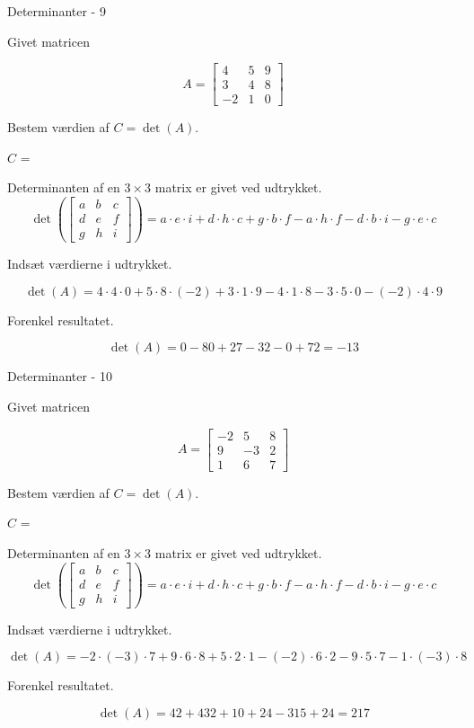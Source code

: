 \documentclass{article}
\begin{document}
\begin{exercise}{Determinanter - 9}
	
	Givet matricen
	
	\[
	A = \left[\begin{array}{rrr}
	4 & 5 & 9 \\ 
	3 & 4 & 8 \\
	-2 & 1 & 0
	\end{array} \right]
	\]
	
	Bestem værdien af $C = \det(A)$.
	
	$C$ = 
	
	\hint
	Determinanten af en $3 \times 3$ matrix er givet ved udtrykket.
	\[
	\det \left( \left[\begin{array}{rrr}
	a & b & c \\ 
	d & e & f \\
	g & h & i
	\end{array} \right] \right) = a \cdot e \cdot i + d \cdot h \cdot c + g \cdot b \cdot f - a \cdot h \cdot f - d \cdot b \cdot i - g \cdot e \cdot c
	\]
	
	\hint
	Indsæt værdierne i udtrykket.
	
	\hint
	\[
	\det \left( A \right) = 4 \cdot 4 \cdot 0 + 5 \cdot 8 \cdot (-2) + 3 \cdot 1 \cdot 9 - 4 \cdot 1 \cdot 8 - 3 \cdot 5 \cdot 0 - (-2) \cdot 4 \cdot 9
	\]
	
	\hint
	Forenkel resultatet.
	
	\hint
	\[
	\det \left( A \right) =  0 - 80 + 27 - 32 - 0 + 72 = -13
	\]
	
\end{exercise}


\begin{exercise}{Determinanter - 10}
	
	Givet matricen
	
	\[
	A = \left[\begin{array}{rrr}
	-2 & 5 & 8 \\ 
	9 & -3 & 2 \\
	1 & 6 & 7
	\end{array} \right]
	\]
	
	Bestem værdien af $C = \det(A)$.
	
	$C$ = 
	
	\hint
	Determinanten af en $3 \times 3$ matrix er givet ved udtrykket.
	\[
	\det \left( \left[\begin{array}{rrr}
	a & b & c \\ 
	d & e & f \\
	g & h & i
	\end{array} \right] \right) = a \cdot e \cdot i + d \cdot h \cdot c + g \cdot b \cdot f - a \cdot h \cdot f - d \cdot b \cdot i - g \cdot e \cdot c
	\]
	
	\hint
	Indsæt værdierne i udtrykket.
	
	\hint
	\[
	\det \left( A \right) = -2 \cdot (-3) \cdot 7 + 9 \cdot 6 \cdot 8 + 5 \cdot 2 \cdot 1 - (-2) \cdot 6 \cdot 2 - 9 \cdot 5 \cdot 7 - 1 \cdot (-3) \cdot 8
	\]
	
	\hint
	Forenkel resultatet.
	
	\hint
	\[
	\det \left( A \right) = 42 + 432 + 10 + 24 - 315 + 24 = 217
	\]
	
\end{exercise}
\end{document}
